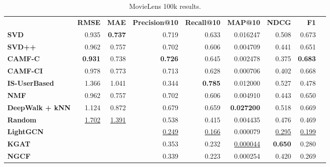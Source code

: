 \begin{table}[!htp]\centering
\caption{MovieLens 100k results.}\label{tab:ml100ktable}
\scriptsize
\begin{tabular}{lrrrrrrrr}\toprule
&\textbf{RMSE} &\textbf{MAE} &\textbf{Precision@10} &\textbf{Recall@10} &\textbf{MAP@10} &\textbf{NDCG} &\textbf{F1} \\\cmidrule{2-8}
\textbf{SVD} &0.935 &\textbf{0.737} &0.719 &0.633 &0.016247 &0.508 &0.673 \\\cmidrule{1-8}
\textbf{SVD++} &0.962 &0.757 &0.702 &0.606 &0.004709 &0.441 &0.651 \\\cmidrule{1-8}
\textbf{CAMF-C} &\textbf{0.931} &0.738 &\textbf{0.726} &0.645 &0.002478 &0.375 &\textbf{0.683} \\\cmidrule{1-8}
\textbf{CAMF-CI} &0.978 &0.773 &0.713 &0.628 &0.000706 &0.402 &0.668 \\\cmidrule{1-8}
\textbf{IS-UserBased} &1.366 &1.041 &0.344 &\textbf{0.785} &0.012000 &0.527 &0.478 \\\cmidrule{1-8}
\textbf{NMF} &0.962 &0.757 &0.702 &0.606 &0.004910 &0.443 &0.650 \\\cmidrule{1-8}
\textbf{DeepWalk + kNN} &1.124 &0.872 &0.679 &0.659 &\textbf{0.027200} &0.518 &0.669 \\\cmidrule{1-8}
\textbf{Random} &\ul{1.702} &\ul{1.391} &0.538 &0.415 &0.004435 &0.476 &0.469 \\\cmidrule{1-8}
\textbf{LightGCN} & & &\ul{0.249} &\ul{0.166} &0.000079 &\ul{0.295} &\ul{0.199} \\\cmidrule{1-1}\cmidrule{1-8}
\textbf{KGAT} & & &0.353 &0.232 &\ul{0.000044} &\textbf{0.650} &0.280 \\\midrule
\textbf{NGCF} & & &0.339 &0.223 &0.000254 &0.420 &0.269 \\
\bottomrule
\end{tabular}
\end{table}

